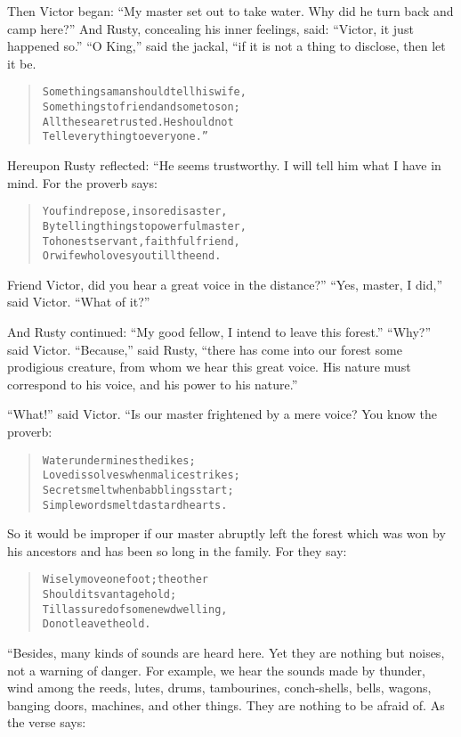\documentclass[article, twoside, 10pt]{memoir}
\renewenvironment{verbatim}{%
\begin{quote}%
\vskip -10pt%
\begin{alltt}\normalfont\small}{\end{alltt}%
\end{quote}%
\vskip -10pt
} %
\begin{document}
Then Victor began:
``My master set out to take water. Why did he turn back and camp here?''
And Rusty, concealing his inner feelings, said:
``Victor, it just happened so.'' ``O King,'' said the jackal, “if
it is not a thing to disclose, then let it be.

\begin{verbatim}
Some things a man should tell his wife,
    Some things to friend and some to son;
All these are trusted. He should not
    Tell everything to everyone.”
\end{verbatim}
Hereupon Rusty reflected: “He seems trustworthy. I will tell him
what I have in mind. For the proverb says:

\begin{verbatim}
You find repose, in sore disaster,
By telling things to powerful master,
To honest servant, faithful friend,
Or wife who loves you till the end.
\end{verbatim}
Friend Victor, did you hear a great voice in the distance?”
``Yes, master, I did,'' said Victor. ``What of it?''

And Rusty continued:
``My good fellow, I intend to leave this forest.'' ``Why?'' said
Victor. ``Because,'' said Rusty,
``there has come into our forest some prodigious creature, from whom we hear this great voice. His nature must correspond to his voice, and his power to his nature.''

``What!'' said Victor. “Is our master frightened by a mere voice?
You know the proverb:

\begin{verbatim}
Water undermines the dikes;
Love dissolves when malice strikes;
Secrets melt when babblings start;
Simple words melt dastard hearts.
\end{verbatim}
So it would be improper if our master abruptly left the forest
which was won by his ancestors and has been so long in the family.
For they say:

\begin{verbatim}
Wisely move one foot; the other
    Should its vantage hold;
Till assured of some new dwelling,
    Do not leave the old.
\end{verbatim}
“Besides, many kinds of sounds are heard here. Yet they are nothing
but noises, not a warning of danger. For example, we hear the
sounds made by thunder, wind among the reeds, lutes, drums,
tambourines, conch-shells, bells, wagons, banging doors, machines,
and other things. They are nothing to be afraid of. As the verse
says:
\end{document}
